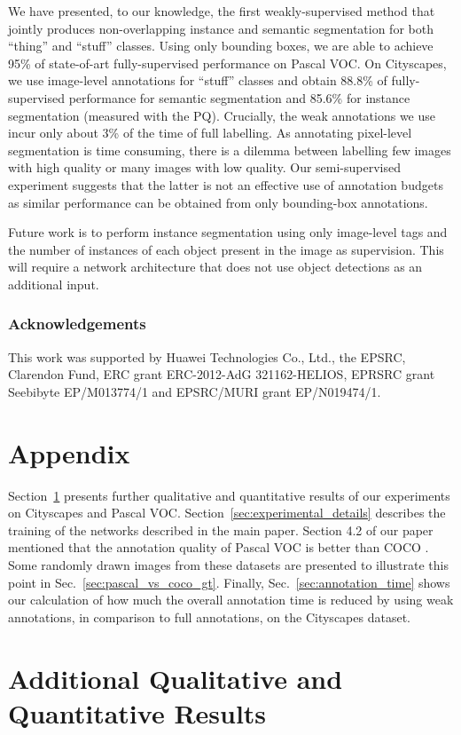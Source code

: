 \documentclass[runningheads]{llncs}
\begin{document}
We have presented, to our knowledge, the first weakly-supervised method that jointly produces non-overlapping instance and semantic segmentation for both ``thing'' and ``stuff'' classes.
Using only bounding boxes, we are able to achieve 95\% of state-of-art fully-supervised performance on Pascal VOC.
On Cityscapes, we use image-level annotations for ``stuff'' classes and obtain 88.8\% of fully-supervised performance for semantic segmentation and 85.6\% for instance segmentation (measured with the PQ).
Crucially, the weak annotations we use incur only about 3\% of the time of full labelling.
As annotating pixel-level segmentation is time consuming, there is a dilemma between labelling few images with high quality or many images with low quality.
Our semi-supervised experiment suggests that the latter is not an effective use of annotation budgets as similar performance can be obtained from only bounding-box annotations.

Future work is to perform instance segmentation using only image-level tags and the number of instances of each object present in the image as supervision.
This will require a network architecture that does not use object detections as an additional input.

\subsubsection*{Acknowledgements}
This work was supported by Huawei Technologies Co., Ltd., the EPSRC, Clarendon Fund, ERC grant ERC-2012-AdG 321162-HELIOS, EPRSRC grant Seebibyte EP/M013774/1 and EPSRC/MURI grant EP/N019474/1.
%
 






\clearpage
\appendix

\section*{Appendix}
Section~\ref{sec:additional_results} presents further qualitative and quantitative results of our experiments on Cityscapes and Pascal VOC.
Section~\ref{sec:experimental_details} describes the training of the networks described in the main paper.
Section 4.2 of our paper mentioned that the annotation quality of Pascal VOC \cite{everingham_2010} is better than COCO \cite{lin_2014}.
Some randomly drawn images from these datasets are presented to illustrate this point in Sec.~\ref{sec:pascal_vs_coco_gt}.
Finally, Sec.~\ref{sec:annotation_time} shows our calculation of how much the overall annotation time is reduced by using weak annotations, in comparison to full annotations, on the Cityscapes dataset. \section{Additional Qualitative and Quantitative Results}
\label{sec:additional_results}
\end{document}
